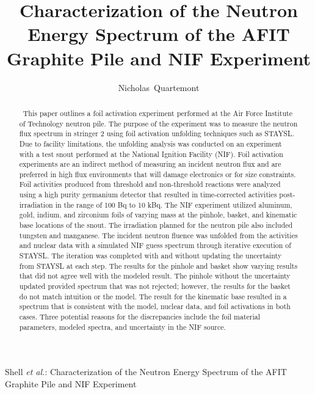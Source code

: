 \documentclass[journal]{IEEEtran}
\begin{document}
	\title{Characterization of the Neutron Energy Spectrum of the AFIT Graphite Pile and NIF Experiment}
	
	\author{Nicholas~Quartemont}
	
	{Shell \MakeLowercase{\textit{et al.}}: Characterization of the Neutron Energy Spectrum of the AFIT Graphite Pile and NIF Experiment }

	\maketitle
	
	\begin{abstract}
		\ This paper outlines a foil activation experiment performed at the Air Force Institute of Technology neutron pile.
The purpose of the experiment was to measure the neutron flux spectrum in stringer 2 using foil activation unfolding techniques such as STAYSL. 
Due to facility limitations, the unfolding analysis was conducted on an experiment with a test snout performed at the National Ignition Facility (NIF). 
Foil activation experiments are an indirect method of measuring an incident neutron flux and are preferred in high flux environments that will damage electronics or for size constraints. Foil activities produced from threshold and non-threshold reactions were analyzed using a high purity germanium detector that resulted in time-corrected activities post-irradiation in the range of 100 Bq to 10 kBq. The NIF experiment utilized aluminum, gold, indium, and zirconium foils of varying mass at the pinhole, basket, and kinematic base locations of the snout. The irradiation planned for the neutron pile also included tungsten and manganese. The incident neutron fluence was unfolded from the activities and nuclear data with a simulated NIF guess spectrum through iterative execution of STAYSL. The iteration was completed with and without updating the uncertainty from STAYSL at each step. The results for the pinhole and basket show varying results that did not agree well with the modeled result. The pinhole without the uncertainty updated provided spectrum that was not rejected; however, the results for the basket do not match intuition or the model. The result for the kinematic base resulted in a spectrum that is consistent with the model, nuclear data, and foil activations in both cases. Three potential reasons for the discrepancies include the foil material parameters, modeled spectra, and uncertainty in the NIF source. 

	\end{abstract}
	
\end{document}
